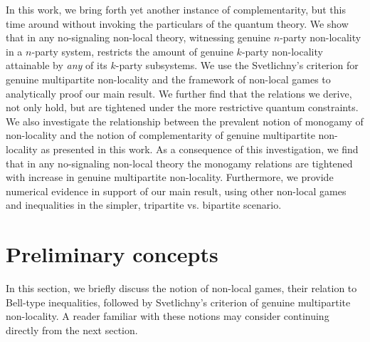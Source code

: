 \documentclass[%
 reprint,
 amsmath,amssymb,
 aps,
]{revtex4-1}
\theoremstyle{plain}
\begin{document}
In this work, we bring forth yet another instance of complementarity, but this time around without invoking the particulars of the quantum theory. We show that in any no-signaling non-local theory, witnessing genuine $n$-party non-locality in a $n$-party system, restricts the amount of genuine $k$-party non-locality attainable by \textit{any} of its $k$-party subsystems. We use the Svetlichny's criterion for genuine multipartite non-locality and the framework of non-local games to analytically proof our main result. We further find that the relations we derive, not only hold, but are tightened under the more restrictive quantum constraints. We also investigate the relationship between the prevalent notion of monogamy of non-locality and the notion of complementarity of genuine multipartite non-locality as presented in this work. As a consequence of this investigation, we find that in any no-signaling non-local theory the monogamy relations are tightened with increase in genuine multipartite non-locality.
Furthermore, we provide numerical evidence in support of our main result, using other non-local games and inequalities in the simpler, tripartite vs. bipartite scenario. \\

\section{Preliminary concepts}
In this section, we briefly discuss the notion of non-local games, their relation to Bell-type inequalities, followed by Svetlichny's criterion of genuine multipartite non-locality. A reader familiar with these notions may consider continuing directly from the next section. 
\end{document}
